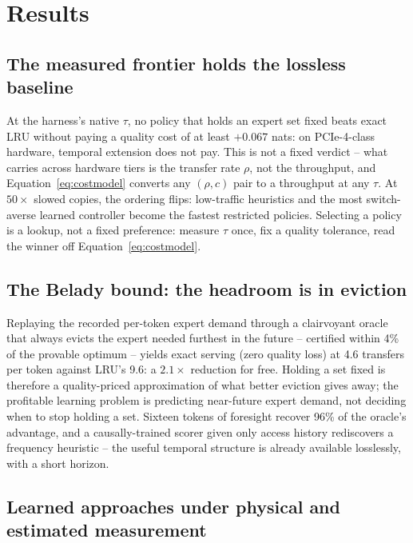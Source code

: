 \documentclass{article}
\begin{document}
\section{Results}

\subsection{The measured frontier holds the lossless baseline}

At the harness's native $\tau$, no policy that holds an expert set fixed beats exact LRU
without paying a quality cost of at least $+0.067$ nats: on PCIe-4-class hardware, temporal
extension does not pay. This is not a fixed verdict -- what carries across hardware tiers is
the transfer rate $\rho$, not the throughput, and Equation~\ref{eq:costmodel} converts any
$(\rho, c)$ pair to a throughput at any $\tau$. At $50\times$ slowed copies, the ordering
flips: low-traffic heuristics and the most switch-averse learned controller become the
fastest restricted policies. Selecting a policy is a lookup, not a fixed preference: measure
$\tau$ once, fix a quality tolerance, read the winner off Equation~\ref{eq:costmodel}.

\subsection{The Belady bound: the headroom is in eviction}

Replaying the recorded per-token expert demand through a clairvoyant oracle that always
evicts the expert needed furthest in the future \citep{belady1966} -- certified within 4\% of
the provable optimum -- yields exact serving (zero quality loss) at 4.6 transfers per token
against LRU's 9.6: a $2.1\times$ reduction for free. Holding a set fixed is therefore a
quality-priced approximation of what better eviction gives away; the profitable learning
problem is predicting near-future expert demand, not deciding when to stop holding a set.
Sixteen tokens of foresight recover 96\% of the oracle's advantage, and a causally-trained
scorer given only access history rediscovers a frequency heuristic -- the useful temporal
structure is already available losslessly, with a short horizon.

\subsection{Learned approaches under physical and estimated measurement}
\end{document}
